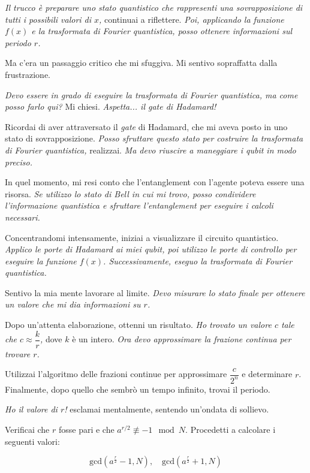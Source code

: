 \emph{Il trucco è preparare uno stato quantistico che rappresenti una sovrapposizione di tutti i possibili valori di \( x \),} continuai a riflettere. \emph{Poi, applicando la funzione \( f(x) \) e la trasformata di Fourier quantistica, posso ottenere informazioni sul periodo \( r \).}

Ma c'era un passaggio critico che mi sfuggiva. Mi sentivo sopraffatta dalla frustrazione.

\emph{Devo essere in grado di eseguire la trasformata di Fourier quantistica, ma come posso farlo qui?} Mi chiesi. \emph{Aspetta... il \textit{gate} di Hadamard!}

Ricordai di aver attraversato il \textit{gate} di Hadamard, che mi aveva posto in uno stato di sovrapposizione. \emph{Posso sfruttare questo stato per costruire la trasformata di Fourier quantistica,} realizzai. \emph{Ma devo riuscire a maneggiare i qubit in modo preciso.}

In quel momento, mi resi conto che l'entanglement con l'agente poteva essere una risorsa. \emph{Se utilizzo lo stato di Bell in cui mi trovo, posso condividere l'informazione quantistica e sfruttare l'entanglement per eseguire i calcoli necessari.}

Concentrandomi intensamente, iniziai a visualizzare il circuito quantistico. \emph{Applico le porte di Hadamard ai miei qubit, poi utilizzo le porte di controllo per eseguire la funzione \( f(x) \). Successivamente, eseguo la trasformata di Fourier quantistica.}

Sentivo la mia mente lavorare al limite. \emph{Devo misurare lo stato finale per ottenere un valore che mi dia informazioni su \( r \).}

Dopo un'attenta elaborazione, ottenni un risultato. \emph{Ho trovato un valore \( c \) tale che \( c \approx \dfrac{k}{r} \),} dove \( k \) è un intero. \emph{Ora devo approssimare la frazione continua per trovare \( r \).}

Utilizzai l'algoritmo delle frazioni continue per approssimare \( \dfrac{c}{2^n} \) e determinare \( r \). Finalmente, dopo quello che sembrò un tempo infinito, trovai il periodo.

\emph{Ho il valore di \( r \)!} esclamai mentalmente, sentendo un'ondata di sollievo.

Verificai che \( r \) fosse pari e che \( a^{r/2} \not\equiv -1 \mod N \). Procedetti a calcolare i seguenti valori:

\[
\text{gcd}\left(a^{\frac{r}{2}} - 1, N\right), \quad \text{gcd}\left(a^{\frac{r}{2}} + 1, N\right)
\]


